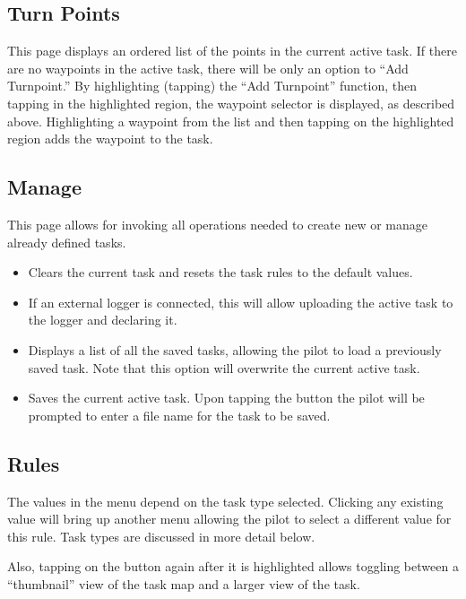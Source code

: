 \subsection*{Turn Points}
This page displays an ordered list of the points in the current active task.
If there are no waypoints in the active task, there 
will be only an option to ``Add Turnpoint.''  By highlighting (tapping) the
``Add Turnpoint'' function, then tapping in the highlighted region, the waypoint
selector is displayed, as described above.  Highlighting a waypoint from the 
list and then tapping on the highlighted region adds the waypoint to the task.

\subsection*{Manage}
This page allows for invoking all operations needed to create new or manage 
already defined tasks.


\begin{itemize}
\item [\bmenuw{New Task}] Clears the current task and resets the task rules to 
  the default values.
\item [\bmenuw{Declare}] If an external logger is connected, this will allow 
  uploading the  active task to the logger and declaring it.
\item [\bmenuw{Browse}] Displays a list of all the saved tasks, allowing the 
  pilot to load a previously saved task.  Note that this option will overwrite 
  the current active task.
\item [\bmenuw{Save}] Saves the current active task.  Upon tapping the 
   button the pilot will be prompted to enter a file name for the 
  task to be saved.
\end{itemize}

\subsection*{Rules}
The values in the menu depend on the task type selected. Clicking any existing 
 value will bring up another menu allowing the pilot to select a 
different value for this rule.  Task types are discussed in more detail below.

Also, tapping on the  button again after it is highlighted allows 
toggling between a ``thumbnail'' view of the task map and a larger view of the task.


